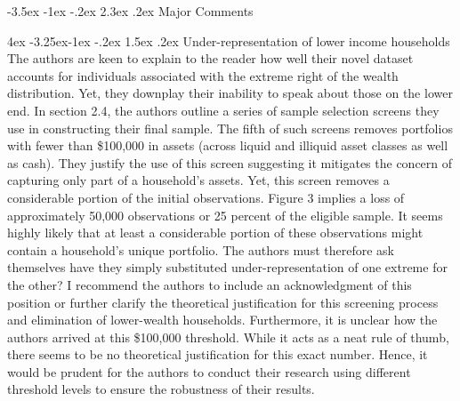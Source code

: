 \documentclass[]{article}
\makeatletter
\newcommand{\bb}{\bigbreak\noindent}
\renewcommand\section{\leftskip 0pt\@startsection {section}{1}{\z@}%
	{-3.5ex \@plus -1ex \@minus -.2ex}%
	{2.3ex \@plus.2ex}%
	{\normalfont\Large\bfseries}}
\renewcommand\subsection{\leftskip 4ex\@startsection{subsection}{2}{\z@}%
	{-3.25ex\@plus -1ex \@minus -.2ex}%
	{1.5ex \@plus .2ex}%
	{\normalfont\large\bfseries}}
\makeatother
\begin{document}
\begin{spacing}{1.25}
\section{Major Comments}


\subsection{Under-representation of lower income households}
The authors are keen to explain to the reader how well their novel dataset accounts for individuals associated with the extreme right of the wealth distribution. Yet, they downplay their inability to speak about those on the lower end. 
In section 2.4, the authors outline a series of sample selection screens they use in constructing their final sample. The fifth of such screens removes portfolios with fewer than \$100,000 in assets (across liquid and illiquid asset classes as well as cash). They justify the use of this screen suggesting it mitigates the concern of capturing only part of a household's assets. Yet, this screen removes a considerable portion of the initial observations. Figure 3 implies a loss of approximately 50,000 observations or 25 percent of the eligible sample. It seems highly likely that at least a considerable portion of these observations might contain a household's unique portfolio. The authors must therefore ask themselves have they simply substituted under-representation of one extreme for the other? I recommend the authors to include an acknowledgment of this position or further clarify the theoretical justification for this screening process and elimination of lower-wealth households. 
\bb
Furthermore, it is unclear how the authors arrived at this \$100,000 threshold. While it acts as a neat rule of thumb, 
there seems to be no theoretical justification for this exact number. Hence, it would be prudent for the authors to conduct their research using different threshold levels to ensure the robustness of their results.

	
	

\end{spacing}
\end{document}
